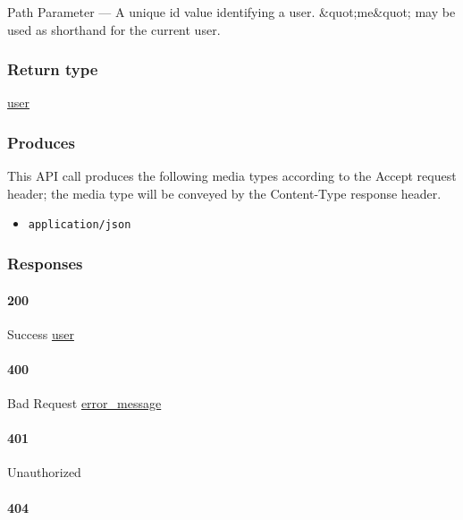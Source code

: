 {Path Parameter} --- A unique id value identifying a user.
\&quot;me\&quot; may be used as shorthand for the current user.

\hypertarget{return-type-98}{%
\subsubsection{Return type}\label{return-type-98}}

\protect\hyperlink{user}{user}

\hypertarget{produces-127}{%
\subsubsection{Produces}\label{produces-127}}

This API call produces the following media types according to the
{Accept} request header; the media type will be conveyed by the
{Content-Type} response header.

\begin{itemize}
\tightlist
\item
  \texttt{application/json}
\end{itemize}

\hypertarget{responses-130}{%
\subsubsection{Responses}\label{responses-130}}

\hypertarget{section-423}{%
\paragraph{200}\label{section-423}}

Success \protect\hyperlink{user}{user}

\hypertarget{section-424}{%
\paragraph{400}\label{section-424}}

Bad Request \protect\hyperlink{error_message}{error\_message}

\hypertarget{section-425}{%
\paragraph{401}\label{section-425}}

Unauthorized \protect\hyperlink{}{}

\hypertarget{section-426}{%
\paragraph{404}\label{section-426}}


